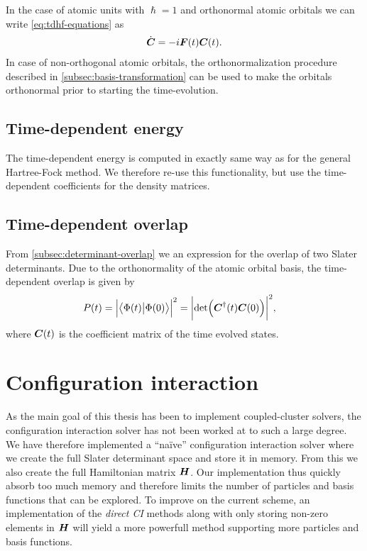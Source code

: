             In the case of atomic units with $\hslash = 1$ and orthonormal
            atomic orbitals we can write \autoref{eq:tdhf-equations} as
            \begin{align}
                \dot{\boldsymbol{C}} = -i\boldsymbol{F}(t)\boldsymbol{C}(t).
                \label{eq:tdhf-orthogonal}
            \end{align}
            In case of non-orthogonal atomic orbitals, the orthonormalization
            procedure described in \autoref{subsec:basis-transformation} can be
            used to make the orbitals orthonormal prior to starting the
            time-evolution.

        \subsection{Time-dependent energy}
            The time-dependent energy is computed in exactly same way as for the
            general Hartree-Fock method.
            We therefore re-use this functionality, but use the time-dependent
            coefficients for the density matrices.

        \subsection{Time-dependent overlap}
            From \autoref{subsec:determinant-overlap} we an expression for the
            overlap of two Slater determinants.
            Due to the orthonormality of the atomic orbital basis, the
            time-dependent overlap is given by
            \begin{align}
                P(t)
                =
                \abs{\braket{\Phi(t)}{\Phi(0)}}^2
                &= \abs{\det(\boldsymbol{C}^{\dagger}(t)\boldsymbol{C}(0))}^{2},
            \end{align}
            where $\boldsymbol{C}(t)$ is the coefficient matrix of the time evolved states.


    \section{Configuration interaction}
        As the main goal of this thesis has been to implement coupled-cluster
        solvers, the configuration interaction solver has not been worked at to
        such a large degree.
        We have therefore implemented a ``naïve'' configuration interaction
        solver where we create the full Slater determinant space and store it in
        memory.
        From this we also create the full Hamiltonian matrix $\boldsymbol{H}$.
        Our implementation thus quickly absorb too much memory and therefore
        limits the number of particles and basis functions that can be explored.
        To improve on the current scheme, an implementation of the \emph{direct
        CI} methods \cite{helgaker-molecular} along with only storing non-zero
        elements in $\boldsymbol{H}$ will yield a more powerfull method supporting
        more particles and basis functions.

